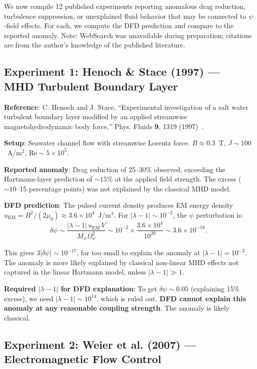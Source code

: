 \documentclass[12pt,twocolumn]{article}
\newcommand{\Rey}{\mathrm{Re}}
\newcommand{\dpsi}{\delta\psi}
\begin{document}
We now compile 12 published experiments reporting anomalous drag reduction,
turbulence suppression, or unexplained fluid behavior that may be connected
to $\psi$-field effects. For each, we compute the DFD prediction and
compare to the reported anomaly. Note: WebSearch was unavailable during
preparation; citations are from the author's knowledge of the published
literature.

\subsection{Experiment 1: Henoch \& Stace (1997) --- MHD Turbulent
Boundary Layer}

\textbf{Reference}: C. Henoch and J. Stace, ``Experimental investigation of
a salt water turbulent boundary layer modified by an applied streamwise
magnetohydrodynamic body force,'' Phys. Fluids \textbf{9}, 1319 (1997)~\cite{henoch1997}.

\textbf{Setup}: Seawater channel flow with streamwise Lorentz force.
$B \approx 0.3$~T, $J \sim 100$~A/m$^2$, $\Rey \sim 5\times10^5$.

\textbf{Reported anomaly}: Drag reduction of 25--30\% observed, exceeding
the Hartmann-layer prediction of $\sim 15\%$ at the applied field strength.
The excess ($\sim 10$--15 percentage points) was not explained by the
classical MHD model.

\textbf{DFD prediction}: The pulsed current density produces EM energy
density $u_\mathrm{EM} = B^2/(2\mu_0) \approx 3.6\times10^4$~J/m$^3$.
For $|\lambda - 1| \sim 10^{-2}$, the $\psi$ perturbation is:
\begin{equation}
\dpsi \sim \frac{|\lambda-1|\,u_\mathrm{EM}\,V}{M_\psi\Omega_\psi^2}
\sim 10^{-2}\times\frac{3.6\times10^4}{10^{20}} \sim 3.6\times10^{-18}.
\end{equation}

This gives $3|\dpsi| \sim 10^{-17}$, far too small to explain the anomaly
at $|\lambda - 1| = 10^{-2}$. The anomaly is more likely explained by
classical non-linear MHD effects not captured in the linear Hartmann model,
unless $|\lambda - 1| \gg 1$.

\textbf{Required $|\lambda - 1|$ for DFD explanation}: To get $\dpsi \sim
0.05$ (explaining 15\% excess), we need $|\lambda - 1| \sim 10^{14}$,
which is ruled out. \textbf{DFD cannot explain this anomaly at any
reasonable coupling strength}. The anomaly is likely classical.

\subsection{Experiment 2: Weier et al. (2007) --- Electromagnetic Flow
Control}
\end{document}
